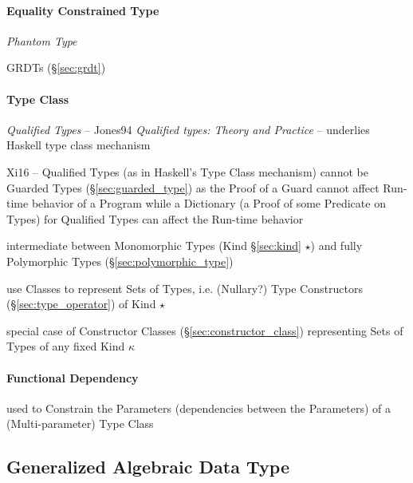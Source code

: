 \paragraph{Equality Constrained Type}
\label{sec:equality_constrained}\hfill

\emph{Phantom Type}

\fist GRDTs (\S\ref{sec:grdt})



\paragraph{Type Class}\label{sec:type_class}\hfill

\emph{Qualified Types} -- \cite{jones94} Jones94 \emph{Qualified
  types: Theory and Practice} -- underlies Haskell type class
mechanism

Xi16 -- Qualified Types (as in Haskell's Type Class mechanism) cannot
be Guarded Types (\S\ref{sec:guarded_type}) as the Proof of a Guard
cannot affect Run-time behavior of a Program while a Dictionary (a
Proof of some Predicate on Types) for Qualified Types can affect the
Run-time behavior

\cite{jones95}

intermediate between Monomorphic Types (Kind \S\ref{sec:kind} $\star$)
and fully Polymorphic Types (\S\ref{sec:polymorphic_type})

use Classes to represent Sets of Types, i.e. (Nullary?) Type
Constructors (\S\ref{sec:type_operator}) of Kind $\star$

special case of Constructor Classes (\S\ref{sec:constructor_class})
representing Sets of Types of any fixed Kind $\kappa$



\paragraph{Functional Dependency}\label{sec:functional_dependency}\hfill

used to Constrain the Parameters (dependencies between the Parameters)
of a (Multi-parameter) Type Class




\subsection{Generalized Algebraic Data Type}\label{sec:gadt}

